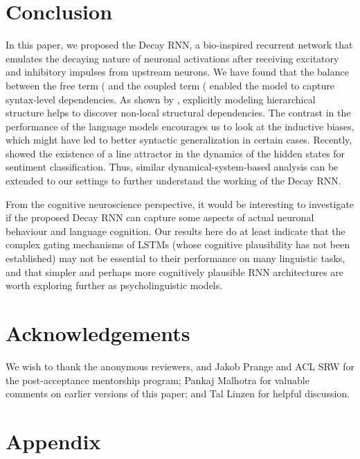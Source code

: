 \documentclass[11pt,a4paper]{article}
\begin{document}
\section{Conclusion}
In this paper, we proposed the Decay RNN, a bio-inspired recurrent network that emulates the decaying nature of neuronal activations after receiving excitatory and inhibitory impulses from upstream neurons. We have found that the balance between the free term ( and the coupled term ( enabled the model to capture syntax-level dependencies. As shown by \citet{mccoy2020does,kuncoro-etal-2018-lstms}, explicitly modeling hierarchical structure helps to discover non-local structural dependencies. The contrast in the performance of the language models encourages us to look at the inductive biases, which might have led to better syntactic generalization in certain cases.
Recently, \citet{maheswaranathan2020recurrent} showed the existence of a line attractor in the dynamics of the hidden states for sentiment classification. Thus, similar dynamical-system-based analysis can be extended to our settings to further understand the working of the Decay RNN.


From the cognitive neuroscience perspective, it would be interesting to investigate if the proposed Decay RNN can capture some aspects of actual neuronal behaviour and language cognition. Our results here do at least indicate that the complex gating mechanisms of LSTMs (whose cognitive plausibility has not been established) may not be essential to their performance on many linguistic tasks, and that simpler and perhaps more cognitively plausible RNN architectures are worth exploring further as psycholinguistic models.

\section*{Acknowledgements}
We wish to thank the anonymous reviewers, and Jakob Prange and ACL SRW for the post-acceptance mentorship program; Pankaj Malhotra for valuable comments on earlier versions of this paper; and Tal Linzen for helpful discussion. 



\clearpage

\appendix
\section{Appendix}
\end{document}
